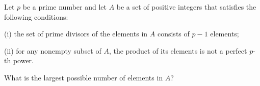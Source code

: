 \item[\textbf{N8.}]Let $p$ be a prime number and let $A$ be a set of positive integers that satisfies the following conditions:

(i) the set of prime divisors of the elements in $A$ consists of $p-1$ elements;

(ii) for any nonempty subset of $A$,  the product of its elements is not a perfect $p$-th power.

What is the largest possible number of elements in $A$?